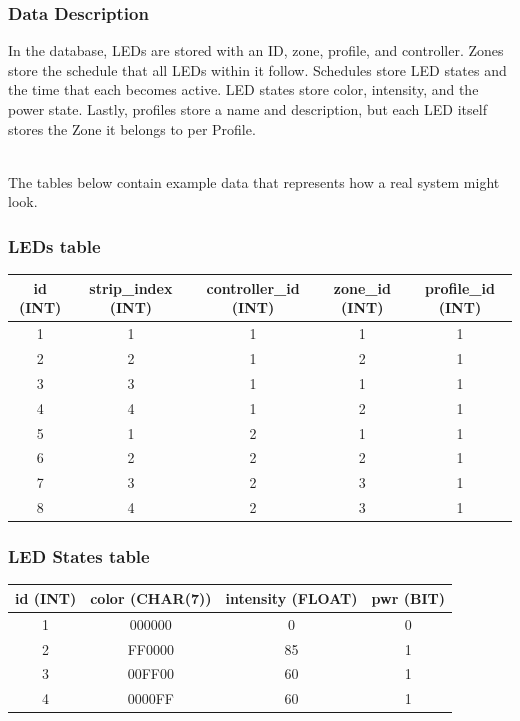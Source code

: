 			\subsubsection{Data Description}
			In the database, LEDs are stored with an ID, zone, profile, and controller. Zones store the schedule that all LEDs within it follow.
			Schedules store LED states and the time that each becomes active. LED states store color, intensity, and the power state.
			Lastly, profiles store a name and description, but each LED itself stores the Zone it belongs to per Profile.

			\noindent \\The tables below contain example data that represents how a real system might look.

			\subsubsection{LEDs table}
				\begin{tabular}{ |c|c|c|c|c| }
					\hline
					id (INT) & strip\_index (INT) & controller\_id (INT) & zone\_id (INT) & profile\_id (INT) \\
					\hline
					1 & 1 & 1 & 1 & 1 \\
					2 & 2 & 1 & 2 & 1 \\
					3 & 3 & 1 & 1 & 1 \\
					4 & 4 & 1 & 2 & 1 \\
					5 & 1 & 2 & 1 & 1 \\
					6 & 2 & 2 & 2 & 1 \\
					7 & 3 & 2 & 3 & 1 \\
					8 & 4 & 2 & 3 & 1 \\
					\hline
				\end{tabular}

			\subsubsection{LED States table}
				\begin{tabular}{ |c|c|c|c| }
					\hline
					id (INT) & color (CHAR(7)) & intensity (FLOAT) & pwr (BIT)\\
					\hline
					1 & 000000 & 0 & 0 \\
					2 & FF0000 & 85 & 1 \\
					3 & 00FF00 & 60 & 1 \\
					4 & 0000FF & 60 & 1 \\
					\hline
				\end{tabular}

